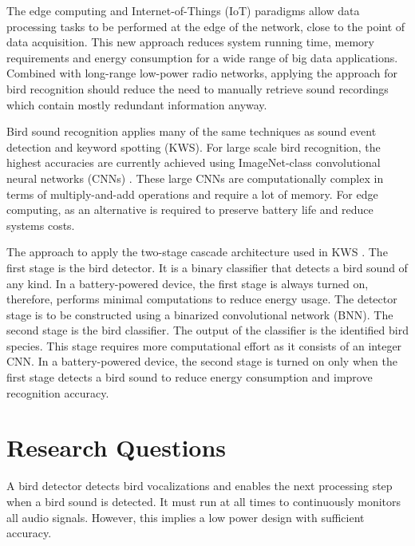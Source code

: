 The edge computing and Internet-of-Things (IoT) paradigms allow data processing tasks to be performed at the edge of the network, close to the point of data acquisition.
This new approach reduces system running time, memory requirements and energy consumption for a wide range of big data applications.
Combined with long-range low-power radio networks, applying the approach for bird recognition should reduce the need to manually retrieve sound recordings which contain mostly redundant information anyway.


Bird sound recognition applies many of the same techniques as sound event detection and keyword spotting (KWS).
For large scale bird recognition, the highest accuracies are currently achieved using ImageNet-class convolutional neural networks (CNNs) \citep{Kahl2019}.
These large CNNs are computationally complex in terms of multiply-and-add operations and require a lot of memory.
For edge computing, as an alternative is required to preserve battery life and reduce systems costs.


The approach to apply the two-stage cascade architecture used in KWS \cite{Sigtia2018,Price2018,Liu2019}.
The first stage is the bird detector.
It is a binary classifier that detects a bird sound of any kind. 
In a battery-powered device, the first stage is always turned on, therefore, performs minimal computations to reduce energy usage.
The detector stage is to be constructed using a binarized convolutional network (BNN). The second stage is the bird classifier.
The output of the classifier is the identified bird species.
This stage requires more computational effort as it consists of an integer CNN.
In a battery-powered device, the second stage is turned on only when the first stage detects a bird sound to reduce energy consumption and improve recognition accuracy.


\section{Research Questions}

A bird detector detects bird vocalizations and enables the next processing step when a bird sound is detected.
It must run at all times to continuously monitors all audio signals. However, this implies a low power design with sufficient accuracy.

